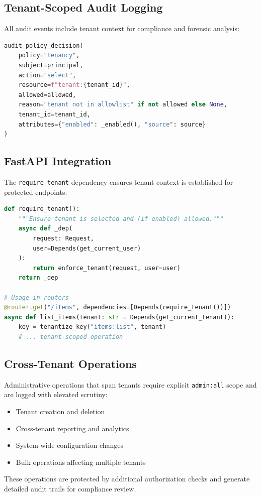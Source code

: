 \subsection{Tenant-Scoped Audit Logging}
\label{subsec:tenant-audit}

All audit events include tenant context for compliance and forensic analysis:

\begin{lstlisting}[language=Python,caption={Audit event with tenant context}]
audit_policy_decision(
    policy="tenancy",
    subject=principal,
    action="select",
    resource=f"tenant:{tenant_id}",
    allowed=allowed,
    reason="tenant not in allowlist" if not allowed else None,
    tenant_id=tenant_id,
    attributes={"enabled": _enabled(), "source": source}
)
\end{lstlisting}

\subsection{FastAPI Integration}
\label{subsec:tenant-fastapi}

The \texttt{require\_tenant} dependency ensures tenant context is established for protected endpoints:

\begin{lstlisting}[language=Python,caption={Tenant requirement in FastAPI routes}]
def require_tenant():
    """Ensure tenant is selected and (if enabled) allowed."""
    async def _dep(
        request: Request, 
        user=Depends(get_current_user)
    ):
        return enforce_tenant(request, user=user)
    return _dep

# Usage in routers
@router.get("/items", dependencies=[Depends(require_tenant())])
async def list_items(tenant: str = Depends(get_current_tenant)):
    key = tenantize_key("items:list", tenant)
    # ... tenant-scoped operation
\end{lstlisting}

\subsection{Cross-Tenant Operations}
\label{subsec:cross-tenant}

Administrative operations that span tenants require explicit \texttt{admin:all} scope and are logged with elevated scrutiny:

\begin{itemize}
    \item Tenant creation and deletion
    \item Cross-tenant reporting and analytics
    \item System-wide configuration changes
    \item Bulk operations affecting multiple tenants
\end{itemize}

These operations are protected by additional authorization checks and generate detailed audit trails for compliance review.

